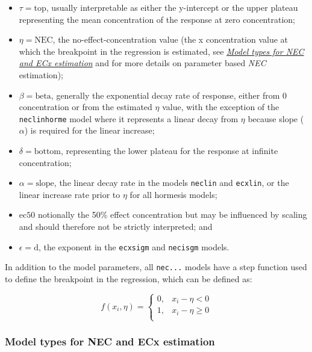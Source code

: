 \documentclass[
]{jss}
\begin{document}
\begin{itemize}
\item
  \(\tau = \text{top}\), usually interpretable as either the y-intercept
  or the upper plateau representing the mean concentration of the
  response at zero concentration;
\item
  \(\eta = \text{NEC}\), the no-effect-concentration value (the x
  concentration value at which the breakpoint in the regression is
  estimated, see
  \protect\hyperlink{model-types-for-nec-and-ecx-estimation}{\textit{Model types for NEC and ECx estimation}}
  and \citet{Fox2010} for more details on parameter based \emph{NEC}
  estimation);
\item
  \(\beta = \text{beta}\), generally the exponential decay rate of
  response, either from 0 concentration or from the estimated \(\eta\)
  value, with the exception of the \texttt{neclinhorme} model where it
  represents a linear decay from \(\eta\) because slope (\(\alpha\)) is
  required for the linear increase;
\item
  \(\delta = \text{bottom}\), representing the lower plateau for the
  response at infinite concentration;
\item
  \(\alpha = \text{slope}\), the linear decay rate in the models
  \texttt{neclin} and \texttt{ecxlin}, or the linear increase rate prior
  to \(\eta\) for all hormesis models;
\item
  \(\text{ec50}\) notionally the 50\% effect concentration but may be
  influenced by scaling and should therefore not be strictly
  interpreted; and
\item
  \(\epsilon = \text{d}\), the exponent in the \texttt{ecxsigm} and
  \texttt{necisgm} models.
\end{itemize}

In addition to the model parameters, all \texttt{nec...} models have a
step function used to define the breakpoint in the regression, which can
be defined as:

\[
f(x_i, \eta) = \begin{cases} 
      0, & x_i - \eta < 0 \\
      1, & x_i - \eta \geq 0 \\
   \end{cases}
\]

\hypertarget{model-types-for-nec-and-ecx-estimation}{%
\subsubsection{Model types for NEC and ECx
estimation}\label{model-types-for-nec-and-ecx-estimation}}
\end{document}
